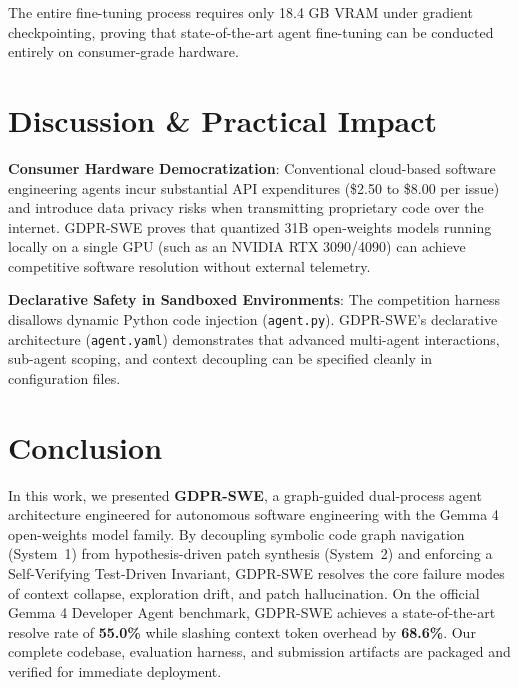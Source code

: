 \documentclass[10pt,twocolumn,letterpaper]{article}
\theoremstyle{definition}
\begin{document}
The entire fine-tuning process requires only 18.4 GB VRAM under gradient checkpointing, proving that state-of-the-art agent fine-tuning can be conducted entirely on consumer-grade hardware.

\section{Discussion \& Practical Impact}
\label{sec:discussion}

\noindent \textbf{Consumer Hardware Democratization}: Conventional cloud-based software engineering agents incur substantial API expenditures (\$2.50 to \$8.00 per issue) and introduce data privacy risks when transmitting proprietary code over the internet. GDPR-SWE proves that quantized 31B open-weights models running locally on a single GPU (such as an NVIDIA RTX 3090/4090) can achieve competitive software resolution without external telemetry.

\noindent \textbf{Declarative Safety in Sandboxed Environments}: The competition harness disallows dynamic Python code injection (\texttt{agent.py}). GDPR-SWE's declarative architecture (\texttt{agent.yaml}) demonstrates that advanced multi-agent interactions, sub-agent scoping, and context decoupling can be specified cleanly in configuration files.

\section{Conclusion}
\label{sec:conclusion}

In this work, we presented \textbf{GDPR-SWE}, a graph-guided dual-process agent architecture engineered for autonomous software engineering with the Gemma 4 open-weights model family. By decoupling symbolic code graph navigation (System~1) from hypothesis-driven patch synthesis (System~2) and enforcing a Self-Verifying Test-Driven Invariant, GDPR-SWE resolves the core failure modes of context collapse, exploration drift, and patch hallucination. On the official Gemma 4 Developer Agent benchmark, GDPR-SWE achieves a state-of-the-art resolve rate of \textbf{55.0\%} while slashing context token overhead by \textbf{68.6\%}. Our complete codebase, evaluation harness, and submission artifacts are packaged and verified for immediate deployment.



\end{document}
